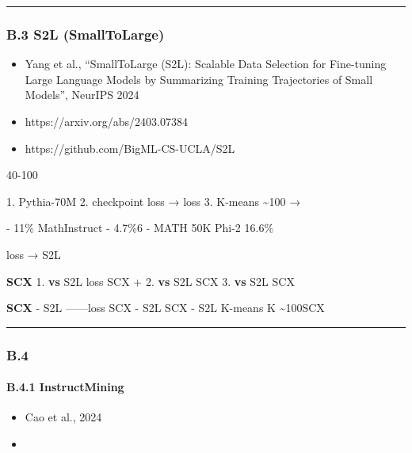\documentclass[
  12pt,
]{article}
\providecommand{\tightlist}{%
  \setlength{\itemsep}{0pt}\setlength{\parskip}{0pt}}
\begin{document}
\begin{center}\rule{0.5\linewidth}{0.5pt}\end{center}

\subsubsection{B.3 S2L (SmallToLarge)}\label{b.3-s2l-smalltolarge}

\begin{itemize}
\tightlist
\item
  \textbf{}Yang et al., ``SmallToLarge (S2L): Scalable Data
  Selection for Fine-tuning Large Language Models by Summarizing
  Training Trajectories of Small Models'', NeurIPS 2024
\item
  \textbf{}https://arxiv.org/abs/2403.07384
\item
  \textbf{}https://github.com/BigML-CS-UCLA/S2L
\end{itemize}

\textbf{} 40-100


\textbf{} 1.  Pythia-70M 2.
 checkpoint  loss →  loss  3. K-means
\textasciitilde100 → 

\textbf{} - 11\% MathInstruct  -
 4.7\%6  - MATH  50K  Phi-2 
16.6\%

\textbf{} loss  → S2L


\textbf{ SCX } 1. \textbf{ vs }S2L
 loss \textbf{}SCX
 +  2.
\textbf{ vs }S2L SCX
 3. \textbf{ vs }S2L
SCX 

\textbf{SCX } - S2L \textbf{}------loss
SCX 
- S2L \textbf{}SCX
 - S2L  K-means  K
\textasciitilde100SCX 

\begin{center}\rule{0.5\linewidth}{0.5pt}\end{center}

\subsubsection{B.4
}\label{b.4-ux5927ux89c4ux6a21ux6307ux4ee4ux5faeux8c03ux6570ux636eux7b5bux9009ux7684ux5176ux5b83ux8fdbux5c55}

\paragraph{B.4.1 InstructMining}\label{b.4.1-instructmining}

\begin{itemize}
\tightlist
\item
  \textbf{}Cao et al., 2024
\item
  \textbf{}
\end{itemize}
\end{document}
